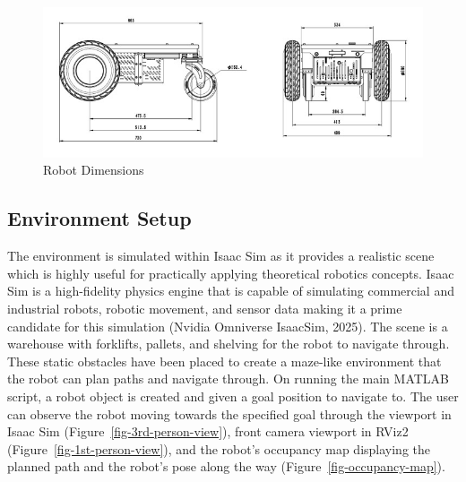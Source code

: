 \documentclass[
  letterpaper,
  DIV=11,
  numbers=noendperiod]{scrartcl}
\begin{document}
\begin{figure}

{\centering \includegraphics{robot-dimensions.png}

}

\caption{\label{fig-robot-dimensions}Robot Dimensions}

\end{figure}

\hypertarget{sec-environment-setup}{%
\subsection{Environment Setup}\label{sec-environment-setup}}

The environment is simulated within Isaac Sim as it provides a realistic
scene which is highly useful for practically applying theoretical
robotics concepts. Isaac Sim is a high-fidelity physics engine that is
capable of simulating commercial and industrial robots, robotic
movement, and sensor data making it a prime candidate for this
simulation (Nvidia Omniverse IsaacSim, 2025). The scene is a warehouse
with forklifts, pallets, and shelving for the robot to navigate through.
These static obstacles have been placed to create a maze-like
environment that the robot can plan paths and navigate through. On
running the main MATLAB script, a robot object is created and given a
goal position to navigate to. The user can observe the robot moving
towards the specified goal through the viewport in Isaac Sim
(Figure~\ref{fig-3rd-person-view}), front camera viewport in RViz2
(Figure~\ref{fig-1st-person-view}), and the robot's occupancy map
displaying the planned path and the robot's pose along the way
(Figure~\ref{fig-occupancy-map}).
\end{document}
